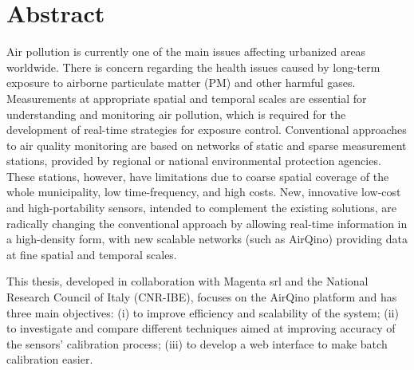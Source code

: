 \chapter{Abstract}\label{ch:abstract}

Air pollution is currently one of the main issues affecting urbanized areas worldwide. There is concern regarding the health issues caused by long-term exposure to airborne particulate matter (PM) and other harmful gases. Measurements at appropriate spatial and temporal scales are essential for understanding and monitoring air pollution, which is required for the development of real-time strategies for exposure control. 
Conventional approaches to air quality monitoring are based on networks of static and sparse measurement stations, provided by regional or national environmental protection agencies. 
These stations, however, have limitations due to coarse spatial coverage of the whole municipality, low time-frequency, and high costs. 
New, innovative low-cost and high-portability sensors, intended to complement the existing solutions, are radically changing the conventional approach by allowing real-time information in a high-density form, with new scalable networks (such as AirQino) providing data at fine spatial and temporal scales.

This thesis, developed in collaboration with Magenta srl and the National Research Council of Italy (CNR-IBE), focuses on the AirQino platform and has three main objectives: (i) to improve efficiency and scalability of the system; (ii) to investigate and compare different techniques aimed at improving accuracy of the sensors' calibration process; (iii) to develop a web interface to make batch calibration easier.
